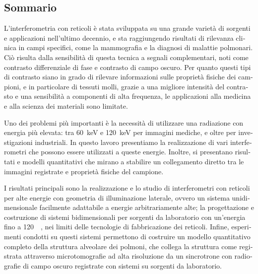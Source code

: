 \begin{otherlanguage}{italian}
\chapter*{Sommario}
L'interferometria con reticoli \`e stata sviluppata su una grande variet\`a
di sorgenti e applicazioni nell'ultimo decennio, e sta raggiungendo
risultati di rilevanza clinica in campi specifici, come la mammografia e la
diagnosi di malattie polmonari. Ci\`o risulta dalla sensibilit\`a di questa
tecnica a segnali complementari, noti come contrasto differenziale di fase e
contrasto di campo oscuro. Per quanto questi tipi di contrasto siano in
grado di rilevare informazioni sulle propriet\`a fisiche dei campioni, e in
particolare di tessuti molli, grazie a una migliore intensit\`a del
contrasto e una sensibilit\`a a componenti di alta frequenza, le
applicazioni alla medicina e alla scienza dei materiali sono limitate.

Uno dei problemi pi\`u importanti \`e la necessit\`a di utilizzare una
radiazione con energia pi\`u elevata: tra \SI{60}{\kilo\eV} e
\SI{120}{\kilo\eV} per immagini mediche, e oltre per investigazioni
industriali. In questo lavoro presentiamo la realizzazione di vari
interferometri che possono essere utilizzati a queste energie. Inoltre,
si presentano risultati e modelli quantitativi che mirano a stabilire un
collegamento diretto tra le immagini registrate e propriet\`a fisiche del
campione.

I risultati principali sono la realizzazione e lo studio di interferometri
con reticoli per alte energie con geometria di illuminazione laterale,
ovvero un sistema unidimensionale facilmente adattabile a energie
arbitrariamente alte; la progettazione e costruzione di sistemi
bidimensionali per sorgenti da laboratorio con un'energia fino a
\SI{120}{\kilo\voltpeak}, nei limiti delle tecnologie di fabbricazione dei
reticoli. Infine, esperimenti condotti su questi sistemi permettono di
costruire un modello quantitativo completo della struttura alveolare dei
polmoni, che collega la struttura come registrata attraverso microtomografie
ad alta risoluzione da un sincrotrone con radiografie di campo oscuro
registrate con sistemi su sorgenti da laboratorio.
\end{otherlanguage}

\endgroup

\vfill
